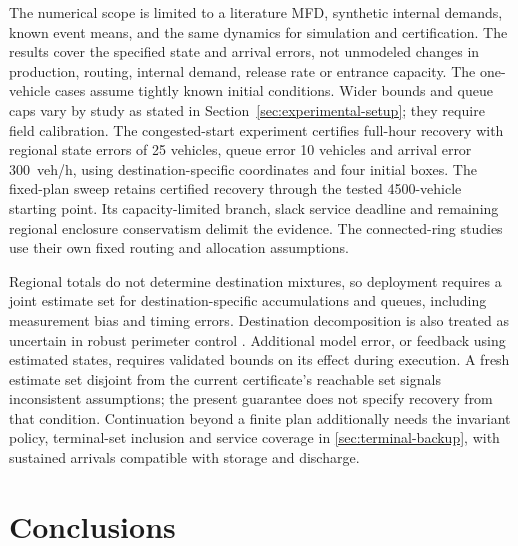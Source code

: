 \documentclass[preprint,12pt]{elsarticle}
\theoremstyle{definition}
\theoremstyle{plain}
\theoremstyle{definition}
\theoremstyle{plain}
\newcommand{\appref}[1]{\ref{#1}}
\begin{document}
The numerical scope is limited to a literature MFD, synthetic internal
demands, known event means, and the same dynamics for simulation and
certification. The results cover the specified state and arrival errors,
not unmodeled changes in production, routing, internal demand, release
rate or entrance capacity. The one-vehicle cases assume tightly known
initial conditions. Wider bounds and queue caps vary by study as stated
in Section~\ref{sec:experimental-setup}; they require field calibration.
The congested-start experiment certifies full-hour recovery with regional
state errors of 25 vehicles, queue error 10 vehicles and arrival error
300~veh/h, using destination-specific coordinates and four initial boxes.
The fixed-plan sweep retains certified recovery through the tested
4500-vehicle starting point. Its capacity-limited branch, slack service
deadline and remaining regional enclosure conservatism delimit the evidence. The connected-ring studies use their own fixed routing and
allocation assumptions.

Regional totals do not determine destination mixtures, so deployment
requires a joint estimate set for destination-specific accumulations and queues,
including measurement bias and timing errors. Destination decomposition
is also treated as uncertain in robust perimeter control
\cite{haddad2015robust}. Additional model error, or feedback using estimated
states, requires validated bounds on its effect during execution. A fresh
estimate set disjoint from the current certificate's reachable set signals
inconsistent assumptions; the present guarantee does not specify recovery
from that condition. Continuation beyond a finite plan additionally needs
the invariant policy, terminal-set inclusion and service coverage in
\appref{sec:terminal-backup}, with sustained arrivals compatible with
storage and discharge.

\section{Conclusions}
\label{sec:new-conclusion}
\end{document}
